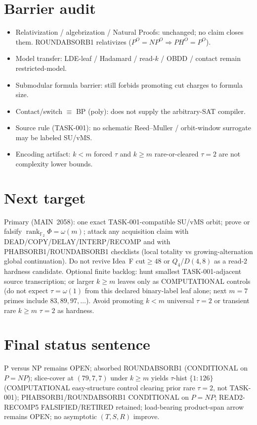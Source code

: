 \documentclass[11pt]{article}
\begin{document}
\section*{Barrier audit}
\begin{itemize}
\item Relativization / algebrization / Natural Proofs: unchanged; no claim closes them.
  ROUNDABSORB1 relativizes ($P^O{=}NP^O\Rightarrow PH^O{=}P^O$).
\item Model transfer: LDE-leaf / Hadamard / read-$k$ / OBDD / contact remain restricted-model.
\item Submodular formula barrier: still forbids promoting cut charges to formula size.
\item Contact/switch $\equiv$ BP (poly): does not supply the arbitrary-SAT compiler.
\item Source rule (TASK-001): no schematic Reed--Muller / orbit-window surrogate may be labeled SU/vMS.
\item Encoding artifact: $k{<}m$ forced $\tau$ and $k{\ge}m$ rare-or-cleared $\tau{=}2$ are not complexity lower bounds.
\end{itemize}

\section*{Next target}
Primary (MAIN~2058): one exact TASK-001-compatible SU/vMS orbit; prove or falsify
$\operatorname{rank}_{\mathbb F_2}\Phi=\omega(m)$; attack any acquisition claim with
DEAD/COPY/DELAY/INTERP/RECOMP and with PHABSORB1/ROUNDABSORB1 checklists
(local totality vs growing-alternation global continuation).
Do not revive Idea~F cut$\ge48$ or $Q_4$/$D(4,8)$ as a read-$2$ hardness candidate.
Optional finite backlog: hunt smallest TASK-001-adjacent source transcription;
or larger $k{\ge}m$ leaves only as COMPUTATIONAL controls (do not expect $\tau=\omega(1)$
from this declared binary-label leaf alone; next $m{=}7$ primes include $83,89,97,\ldots$).
Avoid promoting $k{<}m$ universal $\tau{=}2$ or transient rare $k{\ge}m$ $\tau{=}2$ as hardness.

\section*{Final status sentence}
P versus NP remains OPEN; absorbed ROUNDABSORB1 (CONDITIONAL on $P{=}NP$);
slice-cover at $(79,7,7)$ under $k{\ge}m$ yields $\tau$-hist $\{1{:}126\}$ (COMPUTATIONAL
easy-structure control clearing prior rare $\tau{=}2$, not TASK-001); PHABSORB1/ROUNDABSORB1
CONDITIONAL on $P{=}NP$; READ2-RECOMP5 FALSIFIED/RETIRED retained; load-bearing product-span
arrow remains OPEN; no asymptotic $(T,S,R)$ improve.
\end{document}
